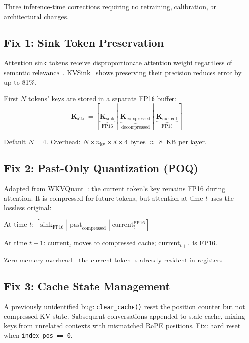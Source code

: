 \documentclass[11pt]{article}
\begin{document}
Three inference-time corrections requiring no retraining, calibration, or architectural changes.

\subsection{Fix 1: Sink Token Preservation}

Attention sink tokens receive disproportionate attention weight regardless of semantic relevance~\citep{xiao2024sinks}. KVSink~\citep{kvsink} shows preserving their precision reduces error by up to 81\%.

First $N$ tokens' keys are stored in a separate FP16 buffer:
\begin{equation}
    \mathbf{K}_{\text{attn}} = [\underbrace{\mathbf{K}_{\text{sink}}}_{\text{FP16}} \;|\; \underbrace{\mathbf{K}_{\text{compressed}}}_{\text{decompressed}} \;|\; \underbrace{\mathbf{K}_{\text{current}}}_{\text{FP16}}]
\end{equation}

Default $N{=}4$. Overhead: $N \times n_{\text{kv}} \times d \times 4$ bytes $\approx$ 8~KB per layer.

\subsection{Fix 2: Past-Only Quantization (POQ)}

Adapted from WKVQuant~\citep{wkvquant}: the current token's key remains FP16 during attention. It is compressed for future tokens, but attention at time $t$ uses the lossless original:

At time $t$: $[\text{sink}_{\text{FP16}} \;|\; \text{past}_{\text{compressed}} \;|\; \text{current}_t^{\text{FP16}}]$

At time $t{+}1$: current$_t$ moves to compressed cache; current$_{t+1}$ is FP16.

Zero memory overhead---the current token is already resident in registers.

\subsection{Fix 3: Cache State Management}

A previously unidentified bug: \texttt{clear\_cache()} reset the position counter but not compressed KV state. Subsequent conversations appended to stale cache, mixing keys from unrelated contexts with mismatched RoPE positions. Fix: hard reset when \texttt{index\_pos == 0}.
\end{document}
